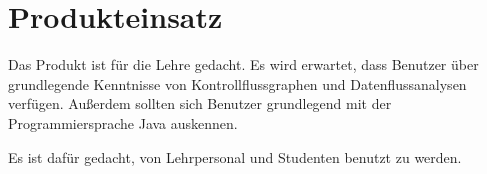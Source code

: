 
\section{Produkteinsatz}

Das Produkt ist für die Lehre gedacht. Es wird erwartet, dass Benutzer über grundlegende Kenntnisse von Kontrollflussgraphen und Datenflussanalysen verfügen.
Außerdem sollten sich Benutzer grundlegend mit der Programmiersprache Java auskennen.

Es ist dafür gedacht, von Lehrpersonal und Studenten benutzt zu werden.